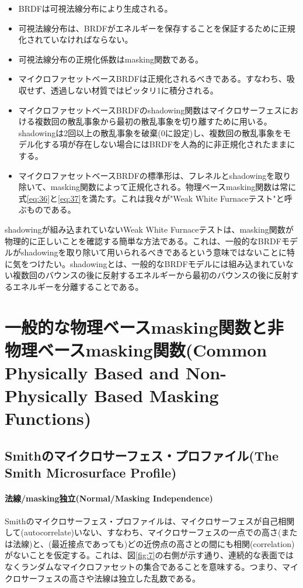 \documentclass[a4j,xelatex,ja=standard]{bxjsarticle}
\begin{document}
\begin{itemize}
\item BRDFは可視法線分布により生成される。
\item 可視法線分布は、BRDFがエネルギーを保存することを保証するために正規化されていなければならない。
\item 可視法線分布の正規化係数はmasking関数である。
\item マイクロファセットベースBRDFは正規化されるべきである。すなわち、吸収せず、透過しない材質ではピッタリ1に積分される。
\item マイクロファセットベースBRDFのshadowing関数はマイクロサーフェスにおける複数回の散乱事象から最初の散乱事象を切り離すために用いる。shadowingは2回以上の散乱事象を破棄(0に設定)し、複数回の散乱事象をモデル化する項が存在しない場合にはBRDFを人為的に非正規化されたままにする。
\item マイクロファセットベースBRDFの標準形は、フレネルとshadowingを取り除いて、masking関数によって正規化される。物理ベースmasking関数は常に式\eqref{eq:36}と\eqref{eq:37}を満たす。これは我々が"Weak White Furnaceテスト"と呼ぶものである。
\end{itemize}

shadowingが組み込まれていないWeak White Furnaceテストは、masking関数が物理的に正しいことを確認する簡単な方法である。これは、一般的なBRDFモデルがshadowingを取り除いて用いられるべきであるという意味ではないことに特に気をつけたい。shadowingとは、一般的なBRDFモデルには組み込まれていない複数回のバウンスの後に反射するエネルギーから最初のバウンスの後に反射するエネルギーを分離することである。

\section{一般的な物理ベースmasking関数と非物理ベースmasking関数(Common Physically Based and Non-Physically Based Masking Functions)}

\subsection{Smithのマイクロサーフェス・プロファイル(The Smith Microsurface Profile)}

\paragraph{法線/masking独立(Normal/Masking Independence)}

Smithのマイクロサーフェス・プロファイルは、マイクロサーフェスが自己相関して(autocorrelate)いない、すなわち、マイクロサーフェスの一点での高さ(または法線)と、(最近接点であっても)どの近傍点の高さとの間にも相関(correlation)がないことを仮定する。これは、図\ref{fig:7}の右側が示す通り、連続的な表面ではなくランダムなマイクロファセットの集合であることを意味する。つまり、マイクロサーフェスの高さや法線は独立した乱数である。
\end{document}
